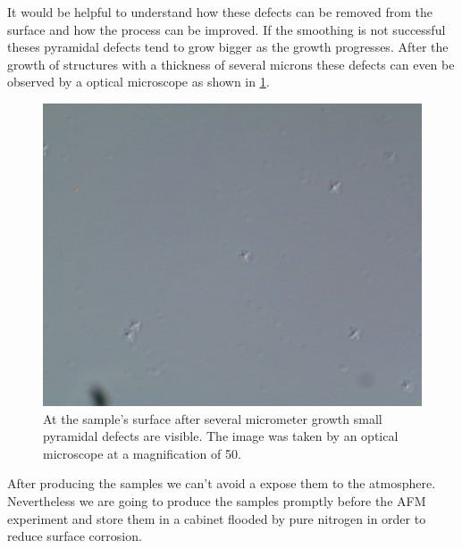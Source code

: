 It would be helpful to understand how these defects can be removed from the surface and how the process can be improved. If the smoothing is not successful theses pyramidal defects tend to grow bigger as the growth progresses. After the growth of structures with a thickness of several microns these defects can even be observed by a optical microscope as shown in \cref{pyramidaldefects}.\\
\begin{figure}
  \includegraphics[width=\linewidth]{Bilder/A2749_50_1}
  \caption{At the sample's surface after several micrometer growth small pyramidal defects are visible. The image was taken by an optical microscope at a magnification of 50.}
  \label{pyramidaldefects}
\end{figure}
After producing the samples we can't avoid a expose them to the atmosphere. Nevertheless we are going to produce the samples promptly before the AFM experiment and store them in a cabinet flooded by pure nitrogen in order to reduce surface corrosion.



%
%	
%

